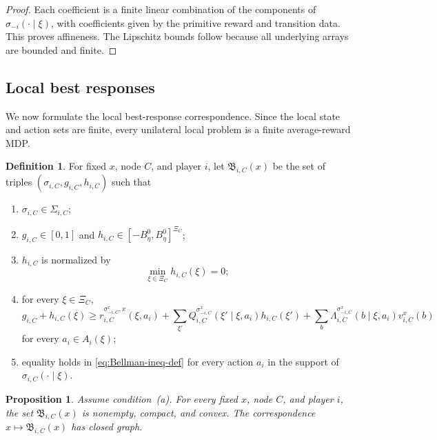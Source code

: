 \documentclass[12pt]{article}
\newtheorem{proposition}[theorem]{Proposition}
\theoremstyle{definition}
\newtheorem{definition}[theorem]{Definition}
\newcommand{\1}{\mathbf{1}}
\begin{document}
\begin{proof}
Each coefficient is a finite linear combination of the components of
$\sigma_{-i}(\cdot\mid\xi)$, with coefficients given by the primitive reward and
transition data.  This proves affineness.  The Lipschitz bounds follow because all
underlying arrays are bounded and finite.
\end{proof}

\subsection{Local best responses}

We now formulate the local best-response correspondence.  Since the local state and
action sets are finite, every unilateral local problem is a finite average-reward
MDP.

\begin{definition}
\label{def:local-BR-set}
For fixed $x$, node $C$, and player $i$, let $\mathfrak B_{i,C}(x)$ be the set of
triples $(\sigma_{i,C},g_{i,C},h_{i,C})$ such that
\begin{enumerate}[label=\textnormal{(BR\arabic*)},leftmargin=2.9em]
\item $\sigma_{i,C}\in \Sigma_{i,C}$;
\item $g_{i,C}\in[0,1]$ and $h_{i,C}\in[-B_\eta^0,B_\eta^0]^{\Xi_C}$;
\item $h_{i,C}$ is normalized by
\[
\min_{\xi\in\Xi_C}h_{i,C}(\xi)=0;
\]
\item for every $\xi\in\Xi_C$,
\begin{equation}
\label{eq:Bellman-ineq-def}
g_{i,C}+h_{i,C}(\xi)
\ge
r_{i,C}^{\sigma_{-i,C}^x,x}(\xi,a_i)
+
\sum_{\xi'}Q_{i,C}^{\sigma_{-i,C}^x}(\xi'\mid\xi,a_i)h_{i,C}(\xi')
+
\sum_b \Lambda_{i,C}^{\sigma_{-i,C}^x}(b\mid\xi,a_i)v_{i,C}^x(b)
\end{equation}
for every $a_i\in A_i(\xi)$;
\item equality holds in \eqref{eq:Bellman-ineq-def} for every action $a_i$ in the
support of $\sigma_{i,C}(\cdot\mid\xi)$.
\end{enumerate}
\end{definition}

\begin{proposition}
\label{prop:local-BR}
Assume condition~\textnormal{(a)}.  For every fixed $x$, node $C$, and player $i$, the set $\mathfrak B_{i,C}(x)$ is
nonempty, compact, and convex.  The correspondence
$x\mapsto \mathfrak B_{i,C}(x)$ has closed graph.
\end{proposition}
\end{document}
